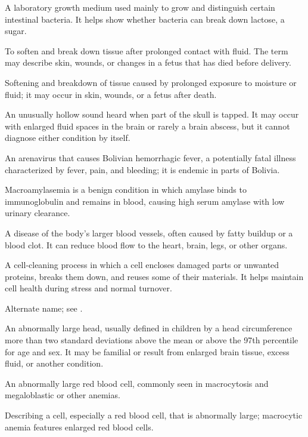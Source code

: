 A laboratory growth medium used mainly to grow and distinguish certain intestinal bacteria. It helps show whether bacteria can break down lactose, a sugar.

 To soften and break down tissue after prolonged contact with fluid. The term may describe skin, wounds, or changes in a fetus that has died before delivery.

 Softening and breakdown of tissue caused by prolonged exposure to moisture or fluid; it may occur in skin, wounds, or a fetus after death.

 An unusually hollow sound heard when part of the skull is tapped. It may occur with enlarged fluid spaces in the brain or rarely a brain abscess, but it cannot diagnose either condition by itself.

 An arenavirus that causes Bolivian hemorrhagic fever, a potentially fatal illness characterized by fever, pain, and bleeding; it is endemic in parts of Bolivia.

 Macroamylasemia is a benign condition in which amylase binds to immunoglobulin and remains in blood, causing high serum amylase with low urinary clearance.

 A disease of the body's larger blood vessels, often caused by fatty buildup or a blood clot. It can reduce blood flow to the heart, brain, legs, or other organs.

 A cell-cleaning process in which a cell encloses damaged parts or unwanted proteins, breaks them down, and reuses some of their materials. It helps maintain cell health during stress and normal turnover.

 Alternate name; see .

 An abnormally large head, usually defined in children by a head circumference more than two standard deviations above the mean or above the 97th percentile for age and sex. It may be familial or result from enlarged brain tissue, excess fluid, or another condition.

 An abnormally large red blood cell, commonly seen in macrocytosis and megaloblastic or other anemias.

 Describing a cell, especially a red blood cell, that is abnormally large; macrocytic anemia features enlarged red blood cells.

